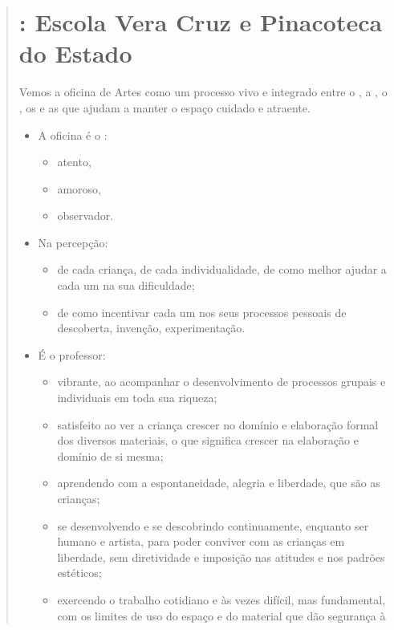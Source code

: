 \begin{quote}
\section{  : Escola Vera Cruz e Pinacoteca do Estado}

Vemos a oficina de Artes como um processo vivo e integrado entre o
, a , o , os   e as 
que ajudam a manter o espaço cuidado e atraente.

\begin{itemize}
\item
  A oficina é o :
  \begin{itemize}
  \item
    atento,
  \item
    amoroso,
  \item
    observador.
  \end{itemize}
\item
  Na percepção:
  \begin{itemize}
  \item
    de cada criança, de cada individualidade, de como melhor ajudar a
    cada um na sua dificuldade;
  \item
    de como incentivar cada um nos seus processos pessoais de
    descoberta, invenção, experimentação.
  \end{itemize}
\item
  É o professor:
  \begin{itemize}
  \item
    vibrante, ao acompanhar o desenvolvimento de processos grupais e
    individuais em toda sua riqueza;
  \item
    satisfeito ao ver a criança crescer no domínio e elaboração formal
    dos diversos materiais, o que significa crescer na elaboração e
    domínio de si mesma;
  \item
    aprendendo com a espontaneidade, alegria e liberdade, que são as
    crianças;
  \item
    se desenvolvendo e se descobrindo continuamente, enquanto ser humano
    e artista, para poder conviver com as crianças em liberdade, sem
    diretividade e imposição nas atitudes e nos padrões estéticos;
  \item
    exercendo o trabalho cotidiano e às vezes difícil, mas fundamental,
    com os limites de uso do espaço e do material que dão segurança à

\end{itemize}
\end{itemize}
\end{quote}
